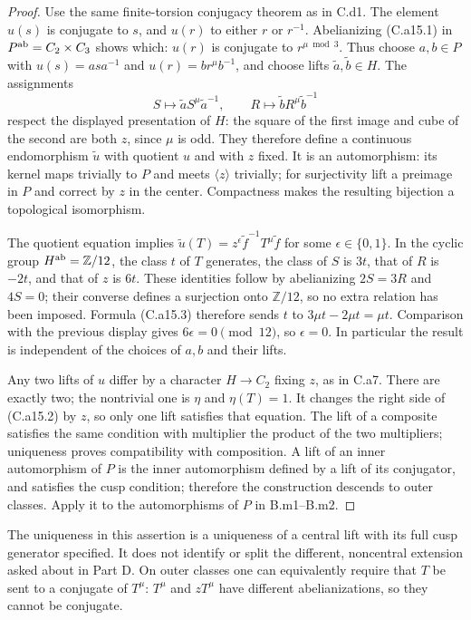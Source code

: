 \begin{proof}
Use the same finite-torsion conjugacy theorem as in C.d1.
The element $u(s)$ is conjugate to $s$, and $u(r)$ to either $r$ or
$r^{-1}$. Abelianizing (C.a15.1) in $P^{\rm ab}=C_2\times C_3$ shows
which: $u(r)$ is conjugate to $r^{\mu\bmod3}$. Thus choose $a,b\in P$
with $u(s)=asa^{-1}$ and $u(r)=br^{\mu}b^{-1}$, and choose lifts
$\widetilde a,\widetilde b\in H$. The assignments
\[
 S\longmapsto\widetilde a S^\mu\widetilde a^{-1},\qquad
 R\longmapsto\widetilde b R^\mu\widetilde b^{-1}
 \tag{C.a15.3}
\]
respect the displayed presentation of $H$: the square of the first
image and cube of the second are both $z$, since $\mu$ is odd. They
therefore define a continuous endomorphism $\widetilde u$ with quotient
$u$ and with $z$ fixed. It is an automorphism: its kernel maps trivially
to $P$ and meets $\langle z\rangle$ trivially; for surjectivity lift a
preimage in $P$ and correct by $z$ in the center. Compactness makes the
resulting bijection a topological isomorphism.

The quotient equation implies
$\widetilde u(T)=z^\epsilon\widetilde f^{-1}T^\mu\widetilde f$
for some $\epsilon\in\{0,1\}$. In the cyclic group
$H^{\rm ab}=\mathbb Z/12$, the class $t$ of $T$ generates, the class
of $S$ is $3t$, that of $R$ is $-2t$, and that of $z$ is $6t$.
These identities follow by abelianizing $2S=3R$ and $4S=0$; their
converse defines a surjection onto $\mathbb Z/12$, so no extra relation
has been imposed. Formula (C.a15.3) therefore sends $t$ to
$3\mu t-2\mu t=\mu t$. Comparison with the previous display gives
$6\epsilon=0\pmod {12}$, so $\epsilon=0$. In particular the result is
independent of the choices of $a,b$ and their lifts.

Any two lifts of $u$ differ by a character $H\to C_2$ fixing $z$,
as in C.a7. There are exactly two; the nontrivial one is $\eta$ and
$\eta(T)=1$. It changes the right side of (C.a15.2) by $z$, so only one
lift satisfies that equation. The lift of a composite satisfies the same
condition with multiplier the product of the two multipliers; uniqueness
proves compatibility with composition. A lift of an inner automorphism
of $P$ is the inner automorphism defined by a lift of its conjugator,
and satisfies the cusp condition; therefore the construction descends
to outer classes. Apply it to the automorphisms of $P$ in B.m1--B.m2.
\end{proof}
The uniqueness in this assertion is a uniqueness of a central lift with
its full cusp generator specified. It does not identify or split the
different, noncentral extension asked about in Part D. On outer classes
one can equivalently require that $T$ be sent to a conjugate of $T^\mu$:
$T^\mu$ and $zT^\mu$ have different abelianizations, so they cannot
be conjugate.

